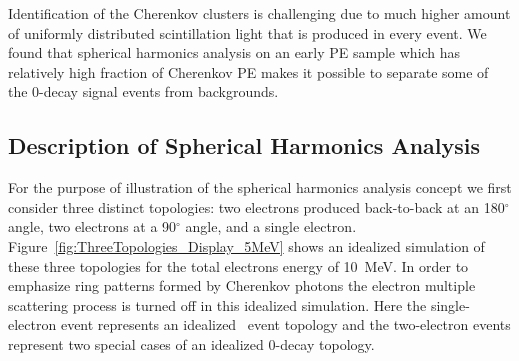 Identification of the Cherenkov clusters is challenging due to much higher amount of uniformly distributed scintillation light that is
produced in every event. We found that spherical harmonics analysis on an early PE sample which has relatively high fraction of 
Cherenkov PE makes it possible to separate some of the 0\nbb-decay signal events from backgrounds.

\subsection{Description of Spherical Harmonics Analysis}

For the purpose of illustration of the spherical harmonics analysis concept we first consider three distinct topologies: 
two electrons produced back-to-back at an 180$^{\circ}$ angle, two electrons at a 90$^{\circ}$ angle, and a single electron.
Figure~\ref{fig:ThreeTopologies_Display_5MeV} shows an idealized simulation of these three topologies for the total electrons 
energy of 10~MeV. In order to emphasize ring patterns formed by Cherenkov photons the electron multiple scattering process is turned off
in this idealized simulation. Here the single-electron event represents an idealized \B~event topology and the two-electron events represent
two special cases of an idealized 0\nbb-decay topology.


